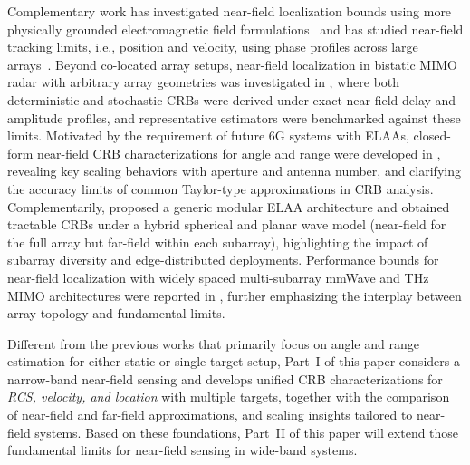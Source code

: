 \documentclass[9pt,final,journal,twocolumn]{IEEEtran}
\begin{document}
Complementary work has investigated near-field localization bounds using more physically grounded electromagnetic field formulations~\cite{torres2021crb} and has studied near-field tracking limits, i.e., position and velocity, using phase profiles across large arrays~\cite{guerra2021near}. Beyond co-located array setups, near-field localization in bistatic MIMO radar with arbitrary array geometries was investigated in \cite{khamidullina2021conditional}, where both deterministic and stochastic CRBs were derived under exact near-field delay and amplitude profiles, and representative estimators were benchmarked against these limits.
Motivated by the requirement of future 6G systems with ELAAs, closed-form near-field CRB characterizations for angle and range were developed in \cite{wang2024crb}, revealing key scaling behaviors with aperture and antenna number, and clarifying the accuracy limits of common Taylor-type approximations in CRB analysis. Complementarily, \cite{meng2024crb} proposed a generic modular ELAA architecture and obtained tractable CRBs under a hybrid spherical and planar wave model (near-field for the full array but far-field within each subarray), highlighting the impact of subarray diversity and edge-distributed deployments.
Performance bounds for near-field localization with widely spaced multi-subarray mmWave and THz MIMO architectures were reported in \cite{yang2024performance}, further emphasizing the interplay between array topology and fundamental limits.

Different from the previous works that primarily focus on angle and range estimation for either static or single target setup, Part~I of this paper considers a narrow-band near-field sensing and develops unified CRB characterizations for \emph{RCS, velocity, and location} with multiple targets, together with the comparison of near-field and far-field approximations, and scaling insights tailored to near-field systems. Based on these foundations, Part~II of this paper \cite{wei2025PartII} will extend those fundamental limits for near-field sensing in wide-band systems.

\vspace{-0.3cm}
\end{document}
